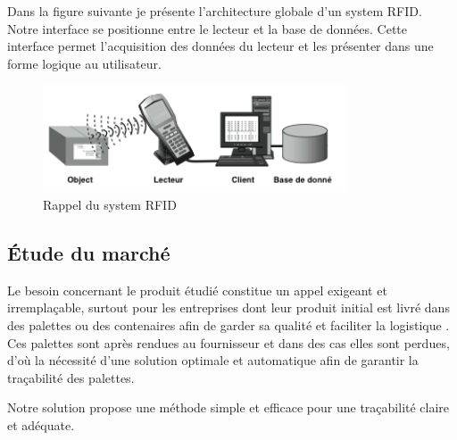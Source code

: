 \documentclass[11pt, a4paper, twoside]{book}
\begin{document}
Dans la figure suivante je présente l'architecture globale d'un system RFID. Notre interface se positionne entre le lecteur et la base de données. Cette interface permet l'acquisition des données du lecteur et les présenter dans une forme logique au utilisateur.

\begin{figure}[H]
\centering
\includegraphics[width=9cm]{systemx}
\caption{Rappel du system RFID}
\end{figure}

\subsection{Étude du marché}
Le besoin concernant le produit étudié constitue un appel exigeant et irremplaçable, surtout pour les entreprises dont leur produit initial est livré dans des palettes ou des contenaires afin de garder sa qualité et faciliter la logistique . Ces palettes sont après rendues au fournisseur et dans des cas elles sont perdues, d'où la nécessité d'une solution optimale et automatique afin de garantir la traçabilité des palettes.

Notre solution propose une méthode simple et efficace pour une traçabilité claire et adéquate.
\end{document}
